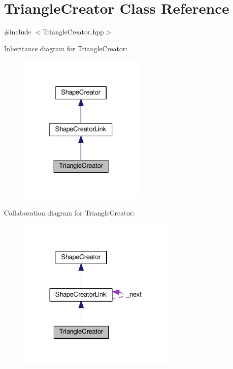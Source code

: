\hypertarget{class_triangle_creator}{}\section{Triangle\+Creator Class Reference}
\label{class_triangle_creator}


{\ttfamily \#include $<$Triangle\+Creator.\+hpp$>$}



Inheritance diagram for Triangle\+Creator\+:\nopagebreak
\begin{figure}[H]
\begin{center}
\leavevmode
\includegraphics[width=175pt]{class_triangle_creator__inherit__graph}
\end{center}
\end{figure}


Collaboration diagram for Triangle\+Creator\+:\nopagebreak
\begin{figure}[H]
\begin{center}
\leavevmode
\includegraphics[width=221pt]{class_triangle_creator__coll__graph}
\end{center}
\end{figure}
